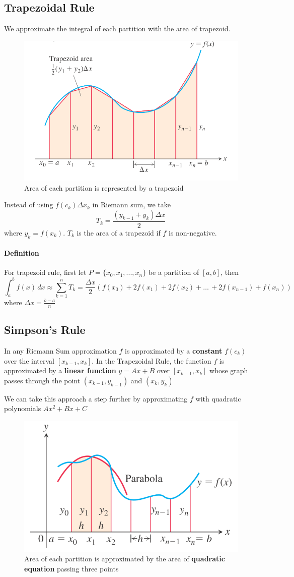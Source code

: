 \documentclass[12pt]{article}
\begin{document}
\subsection{Trapezoidal Rule}
We approximate the integral of each partition with the area of trapezoid.
\begin{figure}[H]
     \centering 
     \includegraphics[width = 0.5\linewidth]{Images/trapezoid rule.png}
     \caption{Area of each partition is represented by a trapezoid}
\end{figure}
Instead of using $f(c_k)\Delta x_k$ in Riemann sum, we take 
\[
    T_k = \frac{(y_{k - 1} + y_k) \Delta x}{2} 
\]
where $y_k = f(x_k)$. $T_k$ is the area of a trapezoid if $f$ is non-negative.
\paragraph{Definition} For trapezoid rule, first let $P = \{x_0, x_1, ..., x_n\}$ be a partition of $[a, b]$, then  
\[
    \int_a^b f(x) \, dx \approx \sum_{k = 1}^n T_k = \frac{\Delta x}{2} (f(x_0) + 2f(x_1) + 2f(x_2) + \dots\, + 2f(x_{n - 1}) + f(x_n)) 
\]
where $\Delta x = \frac{b - a}{n}$

\subsection{Simpson's Rule}
In any Riemann Sum approximation $f$ is approximated by a \textbf{constant} $f(c_k)$ over the interval $[x_{k-1}, x_k]$.
In the Trapezoidal Rule, the function $f$ is approximated by a \textbf{linear function} $y = Ax + B$ over $[x_{k - 1}, x_k]$ whose
graph passes through the point $(x_{k-1}, y_{k - 1})$ and $(x_k, y_k)$

We can take this approach a step further by approximating $f$ with quadratic polynomials $Ax^2 + Bx + C$
\begin{figure}[H]
    \centering 
    \includegraphics[width = 0.5\linewidth]{Images/simpson rule.png}
    \caption{Area of each partition is approximated by the area of \textbf{quadratic equation} passing three points}
\end{figure}
\end{document}
